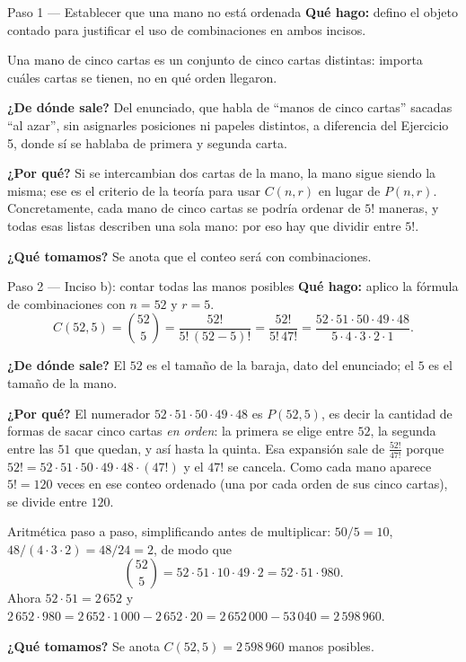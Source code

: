 \documentclass[11pt]{article}
\begin{document}
\begin{paso}{Paso 1 --- Establecer que una mano no está ordenada}
\textbf{Qué hago:} defino el objeto contado para justificar el uso de combinaciones en ambos incisos.

Una mano de cinco cartas es un conjunto de cinco cartas distintas: importa cuáles cartas se tienen, no en qué orden llegaron.

\textbf{¿De dónde sale?} Del enunciado, que habla de ``manos de cinco cartas'' sacadas ``al azar'', sin asignarles posiciones ni papeles distintos, a diferencia del Ejercicio 5, donde sí se hablaba de primera y segunda carta.

\textbf{¿Por qué?} Si se intercambian dos cartas de la mano, la mano sigue siendo la misma; ese es el criterio de la teoría para usar $C(n,r)$ en lugar de $P(n,r)$. Concretamente, cada mano de cinco cartas se podría ordenar de $5!$ maneras, y todas esas listas describen una sola mano: por eso hay que dividir entre $5!$.

\textbf{¿Qué tomamos?} Se anota que el conteo será con combinaciones.
\end{paso}

\begin{paso}{Paso 2 --- Inciso b): contar todas las manos posibles}
\textbf{Qué hago:} aplico la fórmula de combinaciones con $n=52$ y $r=5$.
\[
  C(52,5)=\binom{52}{5}=\frac{52!}{5!\,(52-5)!}=\frac{52!}{5!\,47!}
  =\frac{52\cdot 51\cdot 50\cdot 49\cdot 48}{5\cdot 4\cdot 3\cdot 2\cdot 1}.
\]

\textbf{¿De dónde sale?} El $52$ es el tamaño de la baraja, dato del enunciado; el $5$ es el tamaño de la mano.

\textbf{¿Por qué?} El numerador $52\cdot 51\cdot 50\cdot 49\cdot 48$ es $P(52,5)$, es decir la cantidad de formas de sacar cinco cartas \emph{en orden}: la primera se elige entre $52$, la segunda entre las $51$ que quedan, y así hasta la quinta. Esa expansión sale de $\frac{52!}{47!}$ porque $52!=52\cdot 51\cdot 50\cdot 49\cdot 48\cdot(47!)$ y el $47!$ se cancela. Como cada mano aparece $5!=120$ veces en ese conteo ordenado (una por cada orden de sus cinco cartas), se divide entre $120$.

Aritmética paso a paso, simplificando antes de multiplicar: $50/5=10$, $48/(4\cdot 3\cdot 2)=48/24=2$, de modo que
\[
  \binom{52}{5}=52\cdot 51\cdot 10\cdot 49\cdot 2 = 52\cdot 51\cdot 980 .
\]
Ahora $52\cdot 51=2\,652$ y $2\,652\cdot 980 = 2\,652\cdot 1\,000 - 2\,652\cdot 20 = 2\,652\,000-53\,040=2\,598\,960$.

\textbf{¿Qué tomamos?} Se anota $C(52,5)=2\,598\,960$ manos posibles.
\end{paso}
\end{document}
